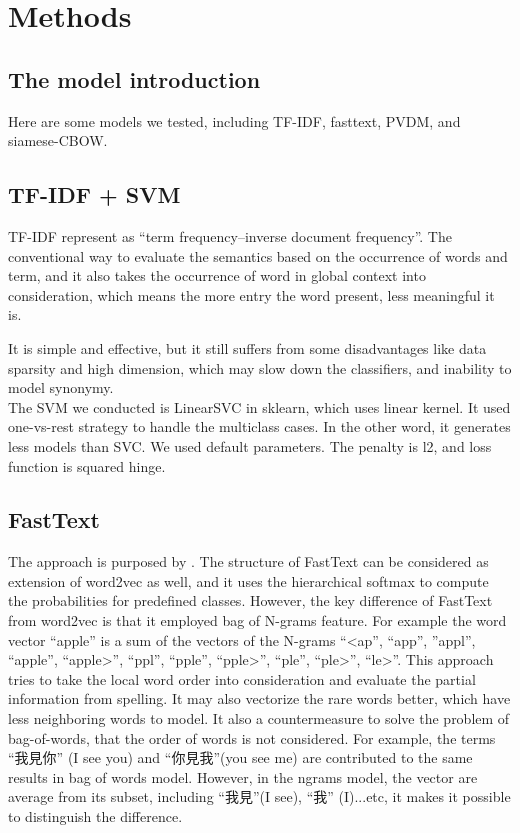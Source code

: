 \chapter{Methods}

\section{The model introduction}

Here are some models we tested, including TF-IDF, fasttext, PVDM, and siamese-CBOW.

\section{TF-IDF + SVM}

	TF-IDF represent as \enquote{term frequency–inverse document frequency}. The conventional way to evaluate the semantics based on the occurrence of words and term, 
  and it also takes the occurrence of word in global context into consideration, which means the more entry the word present, less meaningful it is.

  It is simple and effective, but it still suffers from some disadvantages like data sparsity and high dimension, which may slow down the classifiers, and inability to model synonymy. \\

  The SVM we conducted is LinearSVC in sklearn, which uses linear kernel. It used one-vs-rest strategy to handle the multiclass cases.
  In the other word, it generates less models than SVC.
  We used default parameters. The penalty is l2, and loss function is squared hinge. 

\section{FastText}
	
The approach is purposed by \cite{joulin2016fasttext}. 
The structure of FastText can be considered as extension of word2vec as well, and it uses the hierarchical softmax to compute the probabilities for predefined classes. 
However, the key difference of FastText from word2vec is that it employed bag of N-grams feature. 
For example the word vector “apple” is a sum of the vectors of the N-grams “\textless ap”, “app”, ”appl”, “apple”, “apple\textgreater”, “ppl”, “pple”, “pple\textgreater”, “ple”, “ple\textgreater”, “le\textgreater”.
This approach tries to take the local word order into consideration and evaluate the partial information from spelling. It may also vectorize the rare words better, which have less neighboring words to model.
It also a countermeasure to solve the problem of bag-of-words, that the order of words is not considered. 
For example, the terms \enquote{我見你} (I see you) and \enquote{你見我}(you see me) are contributed to the same results in bag of words model.
However, in the ngrams model, the vector are average from its subset, including \enquote{我見}(I see), \enquote{我} (I)...etc, it makes it possible to distinguish the difference.


